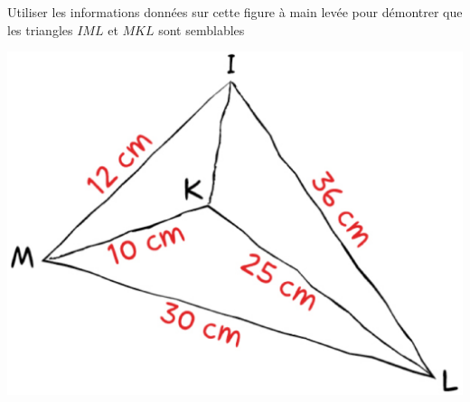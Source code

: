 \begin{minipage}{0.99\linewidth}

\exo

\begin{multicols}{2}
Utiliser les informations données sur cette figure à main levée pour démontrer que les triangles $IML$ et $MKL$ sont semblables

\begin{center}

\includegraphics[scale=.18]{items/MathsP4C42.eps}

\end{center}

\end{multicols}

\end{minipage}

\vspace{0.5cm}
